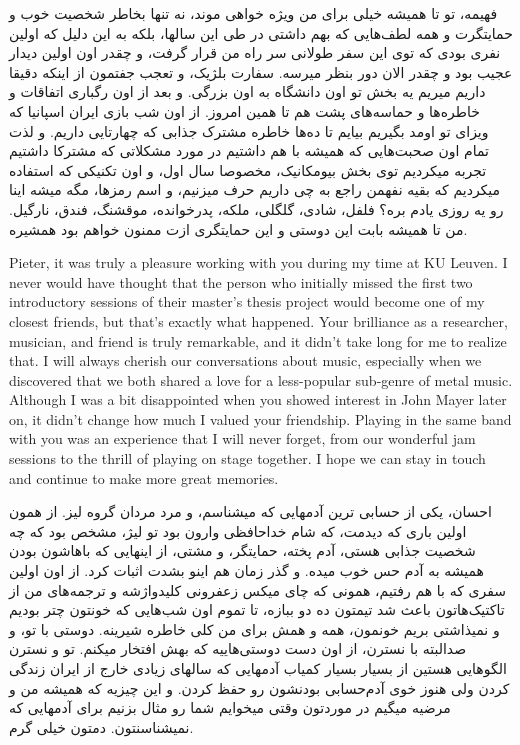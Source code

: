 \begin{flushright}
\foreignlanguage{persian}
{
فهیمه، تو تا همیشه خیلی برای من ویژه خواهی موند، نه تنها بخاطر شخصیت خوب و حمایتگرت و همه لطف‌هایی که بهم داشتی در طی این سالها، بلکه به این دلیل که اولین نفری بودی که توی این سفر طولانی سر راه من قرار گرفت، و چقدر اون اولین دیدار عجیب بود و چقدر الان دور بنظر میرسه. سفارت بلژیک، و تعجب جفتمون از اینکه دقیقا داریم میریم یه بخش تو اون دانشگاه به اون بزرگی. و بعد از اون رگباری اتفاقات و خاطره‌ها و حماسه‌های پشت هم تا همین امروز. از اون شب بازی ایران اسپانیا که ویزای تو اومد بگیریم بیایم تا ده‌ها خاطره مشترک جذابی که چهارتایی داریم. و لذت تمام اون صحبت‌هایی که همیشه با هم داشتیم در مورد مشکلاتی که مشترکا داشتیم تجربه میکردیم توی بخش بیومکانیک، مخصوصا سال اول، و اون تکنیکی که استفاده میکردیم که بقیه نفهمن راجع به چی داریم حرف میزنیم، و اسم رمزها، مگه میشه اینا رو یه روزی یادم بره؟ فلفل، شادی، گلگلی، ملکه، پدرخوانده، موقشنگ، فندق، نارگیل. من تا همیشه بابت این دوستی و این حمایتگری ازت ممنون خواهم بود همشیره.
}
\end{flushright}

Pieter, it was truly a pleasure working with you during my time at KU Leuven. I never would have thought that the person who initially missed the first two introductory sessions of their master's thesis project would become one of my closest friends, but that's exactly what happened. Your brilliance as a researcher, musician, and friend is truly remarkable, and it didn't take long for me to realize that. I will always cherish our conversations about music, especially when we discovered that we both shared a love for a less-popular sub-genre of metal music. Although I was a bit disappointed when you showed interest in John Mayer later on, it didn't change how much I valued your friendship. Playing in the same band with you was an experience that I will never forget, from our wonderful jam sessions to the thrill of playing on stage together. I hope we can stay in touch and continue to make more great memories.

\begin{flushright}
\foreignlanguage{persian}
{
احسان، یکی از حسابی ترین آدمهایی که میشناسم، و مرد مردان گروه لیز. از همون اولین باری که دیدمت، که شام خداحافظی وارون بود تو لیژ، مشخص بود که چه شخصیت جذابی هستی، آدم پخته، حمایتگر، و مشتی، از اینهایی که باهاشون بودن همیشه به آدم حس خوب میده. و گذر زمان هم اینو بشدت اثبات کرد. از اون اولین سفری که با هم رفتیم، همونی که چای میکس زعفرونی کلیدواژشه و ترجمه‌های من از تاکتیک‌هاتون باعث شد تیمتون ده دو ببازه، تا تموم اون شب‌هایی که خونتون چتر بودیم و نمیذاشتی بریم خونمون، همه و همش برای من کلی خاطره شیرینه. دوستی با تو، و صدالبته با نسترن، از اون دست دوستی‌هاییه که بهش افتخار میکنم. تو و نسترن الگوهایی هستین از بسیار بسیار کمیاب آدمهایی که سالهای زیادی خارج از ایران زندگی کردن ولی هنوز خوی آدم‌حسابی بودنشون رو حفظ کردن. و این چیزیه که همیشه من و مرضیه میگیم در موردتون وقتی میخوایم شما رو مثال بزنیم برای آدمهایی که نمیشناسنتون. دمتون خیلی گرم.
}
\end{flushright}

